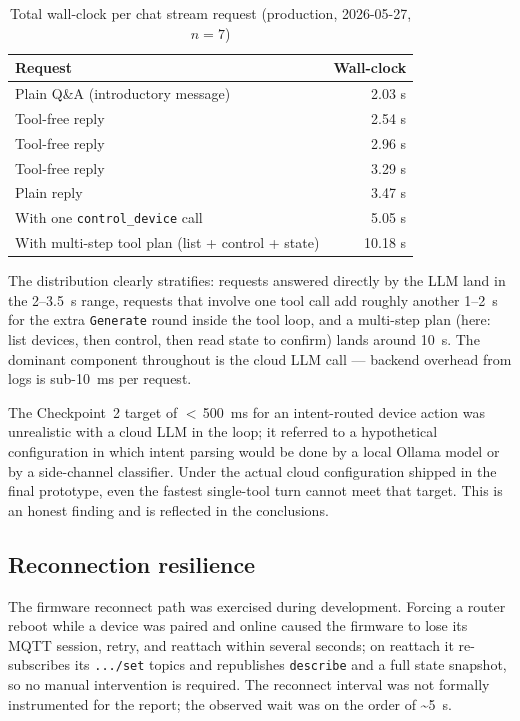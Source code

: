 \documentclass[a4paper,12pt]{article}
\begin{document}
\begin{table}[h]
\centering
\caption{Total wall-clock per chat stream request (production, 2026-05-27, $n=7$)}
\label{tab:chat-stream}
\begin{tabular}{lr}
\toprule
\textbf{Request} & \textbf{Wall-clock} \\
\midrule
Plain Q\&A (introductory message)                  & 2.03 s \\
Tool-free reply                                    & 2.54 s \\
Tool-free reply                                    & 2.96 s \\
Tool-free reply                                    & 3.29 s \\
Plain reply                                        & 3.47 s \\
With one \verb|control_device| call                & 5.05 s \\
With multi-step tool plan (list + control + state) & 10.18 s \\
\bottomrule
\end{tabular}
\end{table}

The distribution clearly stratifies: requests answered directly by the LLM land in the 2--3.5~s range, requests that involve one tool call add roughly another 1--2~s for the extra \verb|Generate| round inside the tool loop, and a multi-step plan (here: list devices, then control, then read state to confirm) lands around 10~s. The dominant component throughout is the cloud LLM call --- backend overhead from logs is sub-10~ms per request.

The Checkpoint~2 target of $<\,$500~ms for an intent-routed device action was unrealistic with a cloud LLM in the loop; it referred to a hypothetical configuration in which intent parsing would be done by a local Ollama model or by a side-channel classifier. Under the actual cloud configuration shipped in the final prototype, even the fastest single-tool turn cannot meet that target. This is an honest finding and is reflected in the conclusions.

\subsection{Reconnection resilience}

The firmware reconnect path was exercised during development. Forcing a router reboot while a device was paired and online caused the firmware to lose its MQTT session, retry, and reattach within several seconds; on reattach it re-subscribes its \verb|.../set| topics and republishes \verb|describe| and a full state snapshot, so no manual intervention is required. The reconnect interval was not formally instrumented for the report; the observed wait was on the order of \textasciitilde5~s.
\end{document}
